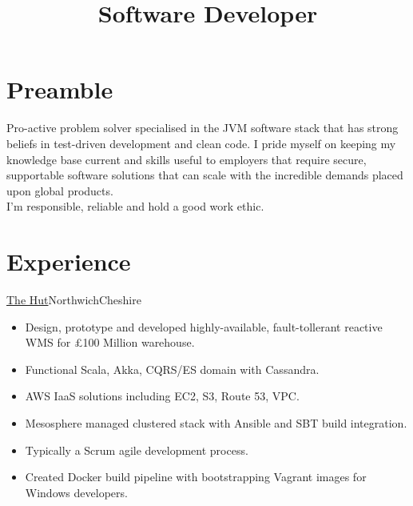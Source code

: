 \documentclass[a4paper,10pt]{moderncv}
\title{Software Developer}
\newcommand\weblink[2] {{\color{href} \href{#1}{#2}}}
\begin{document}
\maketitle

\section{Preamble}
Pro-active problem solver specialised in the JVM software stack that has strong beliefs in test-driven development and clean code.
I pride myself on keeping my knowledge base current and skills useful to employers that require secure, supportable software solutions that can scale with the incredible demands placed upon global products.\\

I'm responsible, reliable and hold a good work ethic.

\section{Experience}

{\weblink{http://www.thehutgroup.com}{The Hut}}{Northwich}{Cheshire}{
\begin{itemize}
  \item Design, prototype and developed highly-available, fault-tollerant reactive WMS for £100 Million warehouse.
  \item Functional Scala, Akka, CQRS/ES domain with Cassandra.
  \item AWS IaaS solutions including EC2, S3, Route 53, VPC.
  \item Mesosphere managed clustered stack with Ansible and SBT build integration.
  \item Typically a Scrum agile development process.
  \item Created Docker build pipeline with bootstrapping Vagrant images for Windows developers.
\end{itemize}
}
\end{document}
